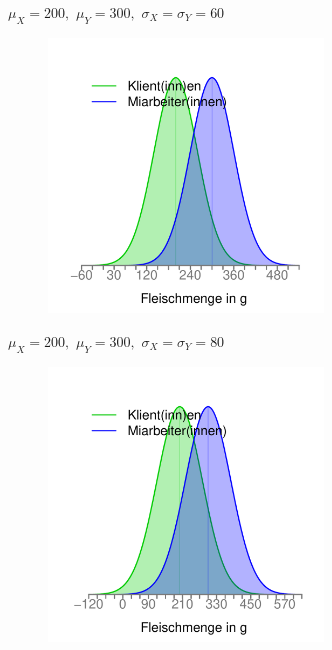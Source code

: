 \documentclass[usenames,dvipsnames,handout]{beamer}
\begin{document}
\begin{frame}{$\mu_{X}=200,$ $\mu_{Y}=300,$ $\sigma_{X}=\sigma_{Y}=60$}
  \begin{figure}[ht]
 	\centering
 	      \includegraphics[width=0.65\textwidth]{mx200my300sd60.pdf}
 	\end{figure}
\end{frame}
%
\begin{frame}{$\mu_{X}=200,$ $\mu_{Y}=300,$ $\sigma_{X}=\sigma_{Y}=80$}
  \begin{figure}[ht]
 	\centering
 	      \includegraphics[width=0.65\textwidth]{mx200my300sd80.pdf}
 	\end{figure}
\end{frame}
%
\end{document}
